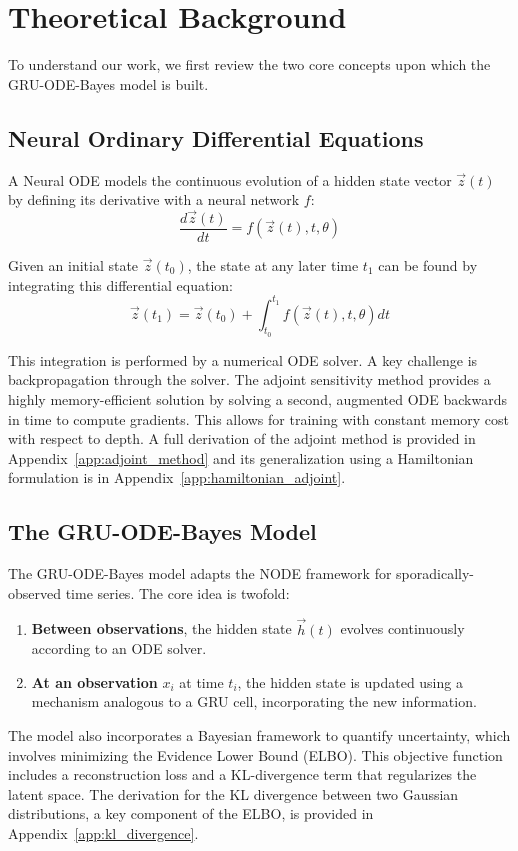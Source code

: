 \section{Theoretical Background}
\label{sec:background}
To understand our work, we first review the two core concepts upon which the GRU-ODE-Bayes model is built.

\subsection{Neural Ordinary Differential Equations}

A Neural ODE models the continuous evolution of a hidden state vector
$\vec{z}(t)$ by defining its derivative with a neural network $f$:
\begin{equation}
    \frac{d\vec{z}(t)}{dt} = f(\vec{z}(t), t, \theta)
\end{equation}

Given an initial state $\vec{z}(t_0)$, the state at any later 
time $t_1$ can be found by integrating this differential equation:
\begin{equation}
    \vec{z}(t_1) = \vec{z}(t_0) + \int_{t_0}^{t_1} f(\vec{z}(t), t, \theta) dt
\end{equation}

This integration is performed by a numerical ODE solver. 
A key challenge is backpropagation through the solver. 
The adjoint sensitivity method \cite{chen2019neuralordinarydifferentialequations} 
provides a highly memory-efficient solution by solving a second, augmented ODE backwards 
in time to compute gradients. This allows for training with constant memory cost with respect to depth. 
A full derivation of the adjoint method is provided in 
Appendix~\ref{app:adjoint_method} and its generalization using a Hamiltonian formulation 
is in Appendix~\ref{app:hamiltonian_adjoint}.

\subsection{The GRU-ODE-Bayes Model}

The GRU-ODE-Bayes model \cite{debrouwer2019gruodebayescontinuousmodelingsporadicallyobserved} 
adapts the NODE framework for sporadically-observed time series. The core idea is twofold:
\begin{enumerate}
    \item \textbf{Between observations}, the hidden state $\vec{h}(t)$ evolves continuously 
    according to an ODE solver.
    \item \textbf{At an observation} $x_i$ at time $t_i$, the hidden state is updated using a 
    mechanism analogous to a GRU cell, incorporating the new information.
\end{enumerate}

The model also incorporates a Bayesian framework to quantify uncertainty, which involves minimizing the 
Evidence Lower Bound (ELBO).
This objective function includes a reconstruction loss and a KL-divergence term that regularizes the latent space. 
The derivation for the KL divergence between two Gaussian distributions, a key component of the ELBO, 
is provided in Appendix~\ref{app:kl_divergence}.
